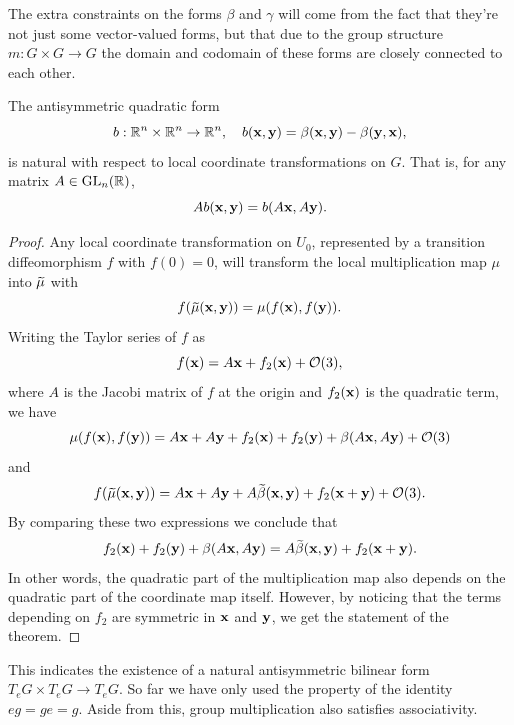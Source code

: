 The extra constraints on the forms $\beta$ and $\gamma$ will come from the fact that they're not just some vector-valued forms, but that due to the group structure $m:G\times G\to G$ the domain and codomain of these forms are closely connected to each other. 



\begin{lem}
    The antisymmetric quadratic form
    \[b:\bbR^n\times\bbR^n\to \bbR^n,\quad b(\bf{x},\bf{y})=\beta(\bf{x},\bf{y})-\beta(\bf{y},\bf{x}),\]
    is natural with respect to local coordinate transformations on $G$. That is, for any matrix $A\in\GL_n(\bbR)$,
    \[A b(\bf{x},\bf{y})=b(A\bf{x},A\bf{y}).\]
\end{lem}
\begin{proof}
    Any local coordinate transformation on $U_0$, represented by a transition diffeomorphism $f$ with $f(0)=0$, will transform the local multiplication map $\mu$ into $\wt{\mu}$ with
    \[f(\wt\mu(\bf{x},\bf{y}))=\mu(f(\bf{x}),f(\bf{y})).\]
    Writing the Taylor series of $f$ as
    \[f(\bf{x})=A\bf{x}+f_2(\bf{x})+\calO(3),\]
    where $A$ is the Jacobi matrix of $f$ at the origin and $f_2(\bf{x})$ is the quadratic term, we have
    \[\mu(f(\bf{x}),f(\bf{y}))=A\bf{x}+A\bf{y}+f_2(\bf{x})+f_2(\bf{y})+\beta(A\bf{x},A\bf{y})+\calO(3)\]
    and
    \[f(\wt\mu(\bf{x},\bf{y}))=A\bf{x}+A\bf{y}+A\wt\beta(\bf{x},\bf{y})+f_2(\bf{x}+\bf{y})+\calO(3).\]
    By comparing these two expressions we conclude that
    \[f_2(\bf{x})+f_2(\bf{y})+\beta(A\bf{x},A\bf{y})=A\wt\beta(\bf{x},\bf{y})+f_2(\bf{x}+\bf{y}).\]
    In other words, the quadratic part of the multiplication map also depends on the quadratic part of the coordinate map itself. However, by noticing that the terms depending on $f_2$ are symmetric in $\bf{x}$ and $\bf{y}$, we get the statement of the theorem.
\end{proof}

This indicates the existence of a natural antisymmetric bilinear form $T_e G\times T_eG\to T_e G$. So far we have only used the property of the identity $eg=ge=g$. Aside from this, group multiplication also satisfies associativity.

